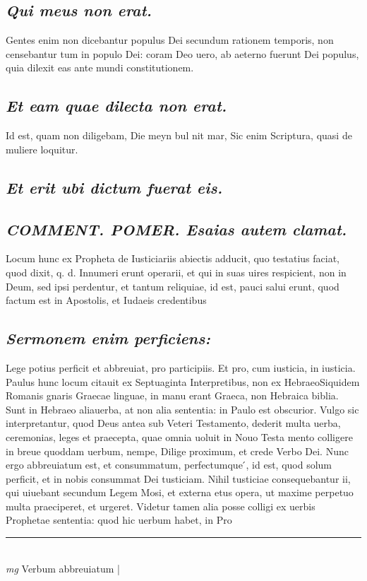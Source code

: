 \documentclass{article}
\begin{document}
\begin{pages}
\subsection*{\textit{Qui meus non erat. }}\pstart Gentes enim non dicebantur populus Dei secundum rationem temporis, non censebantur tum in populo Dei: coram Deo uero, ab aeterno fuerunt Dei populus, quia dilexit eas ante mundi constitutionem.   \pend
{}
{}
\subsection*{\textit{Et eam quae dilecta non erat. }}\pstart Id est, quam non diligebam, Die meyn bul nit mar, Sic enim Scriptura, quasi de muliere loquitur.  \pend
{}
{}
\subsection*{\textit{Et erit ubi dictum fuerat eis. }}
{}
\subsection*{\textit{\huge\textbf{COMMENT. POMER. }\normalsize Esaias autem clamat. }}\pstart Locum hunc ex Propheta de Iusticiariis abiectis adducit, quo testatius faciat, quod dixit, q. d. Innumeri erunt operarii, et qui in suas uires respicient, non in Deum, sed ipsi perdentur, et tantum reliquiae, id est, pauci salui erunt, quod factum est in Apostolis, et Iudaeis credentibus\pend
{}
{}
\subsection*{\textit{Sermonem enim perficiens: }}\pstart Lege potius perficit et abbreuiat, pro participiis. Et pro, cum iusticia, in iusticia. Paulus hunc locum citauit ex Septuaginta Interpretibus, non ex HebraeoSiquidem Romanis gnaris Graecae linguae, in manu erant Graeca, non Hebraica biblia. Sunt in Hebraeo aliauerba, at non alia sententia: in Paulo est obscurior. Vulgo sic interpretantur, quod Deus antea sub Veteri Testamento, dederit multa uerba, ceremonias, leges et praecepta, quae omnia uoluit in Nouo Testa mento colligere in breue quoddam uerbum, nempe, Dilige proximum, et crede Verbo Dei. Nunc ergo abbreuiatum est, et consummatum, perfectumque ́, id est, quod solum perficit, et in nobis consummat Dei tusticiam. Nihil tusticiae consequebantur ii, qui uiuebant secundum Legem Mosi, et externa etus opera, ut maxime perpetuo multa praeciperet, et urgeret. Videtur tamen alia posse colligi ex uerbis Prophetae sententia: quod hic uerbum habet, in Pro\pend
\vspace{0.5cm}\noindent
\vspace{0.2cm}\rule{1cm}{0.2pt}\\ 
\hspace{0.2cm}\textit{mg}
\footnotesize Verbum abbreuiatum 
\normalsize| 

\end{pages}
\end{document}
